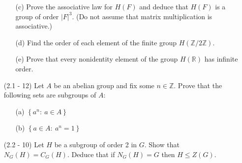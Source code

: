 \documentclass[12pt]{article}
\begin{document}
\begin{enumerate}
\begin{enumerate}
\begin{mybox}
        \end{mybox}

        \item[(c)] Prove the associative law for $H(F)$ and
        deduce that $H(F)$ is a group of order $|F|^3$.
        (Do not assume that matrix multiplication
        is associative.)
        \begin{mybox}
            
        \end{mybox}

        \item[(d)] Find the order of each element of the
        finite group $H(\mathbb{Z}/2\mathbb{Z})$.
        \begin{mybox}
            
        \end{mybox}

        \item[(e)] Prove that every nonidentity element of the
        group $H(\mathbb{R})$ has infinite order.
        \begin{mybox}
            
        \end{mybox}
    \end{enumerate}
  
\item[(2.1 - 12)] Let $A$ be an abelian group and fix some
    $n\in\mathbb{Z}$. Prove that the following sets are
    subgroups of $A$:
    \begin{enumerate}
        \item[(a)] $\left\{a^n : \ a\in A\right\}$
        \begin{mybox}
            
        \end{mybox}

        \item[(b)] $\left\{a\in A: \ a^n=1\right\}$
        \begin{mybox}
            
        \end{mybox}
    \end{enumerate}

 
\item[(2.2 - 10)] Let $H$ be a subgroup of order 2 in $G$. Show that
    $N_G(H) = C_G(H)$. Deduce that if $N_G(H) = G$ then
    $H\leq Z(G)$.

\begin{mybox}

\end{mybox}



\end{enumerate}
\end{document}
